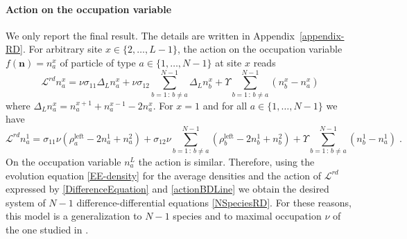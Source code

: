 \documentclass[10pt]{article}
\numberwithin{equation}{section}
\numberwithin{equation}{subsection}
\newcommand{\dt}{\;.}
\begin{document}
\paragraph{Action on the occupation variable}
We only report the final result. The details are written in Appendix~\ref{appendix-RD}. For arbitrary site $x\in \{2,\ldots,L-1\}$, the action on the occupation variable $f(\bm{n})=n_{a}^{x}$ of particle of type $a\in \{1,\ldots,N-1\}$ at site $x$ reads
\begin{equation}\label{DifferenceEquation}
	\mathcal{L}^{rd}n_{a}^{x}=\nu\sigma_{11}\Delta_{L}n_{a}^{x}+\nu\sigma_{12}\sum_{b=1\,:\,b\neq a}^{N-1}\Delta_{L}n_{b}^{x}+\Upsilon\sum_{b=1\,:\,b\neq a}^{N-1}(n_{b}^{x}-n_{a}^{x})
\end{equation}
where $\Delta_{L}n_{a}^{x}= n_{a}^{x+1}+n_{a}^{x-1}-2n_{a}^{x}$. For $x=1$ and for all $a\in \{1,\ldots,N-1\}$ we have 
\begin{equation}\label{actionBDLine}
	\mathcal{L}^{rd}n_{a}^{1}=\sigma_{11}\nu \left(\rho_{a}^{\text{left}}-2n_{a}^{1}+n_{a}^{2}\right)+\sigma_{12}\nu\sum_{b=1\,:\,b\neq a}^{N-1}\left(\rho_{b}^{\text{left}}-2n_{b}^{1}+n_{b}^{2}\right)+\Upsilon\sum_{b=1\,:\,b\neq a}^{N-1}\left(n_{b}^{1}-n_{a}^{1}\right)\dt
\end{equation}
On the occupation variable $n_{a}^{L}$ the action is similar. Therefore, using the evolution equation \eqref{EE-density} for the average densities and  the action of $\mathcal{L}^{rd}$ expressed by \eqref{DifferenceEquation} and \eqref{actionBDLine} we obtain the desired system of $N-1$ difference-differential equations \eqref{NSpeciesRD}. For these reasons, this model is a generalization to $N-1$ species and to maximal occupation $\nu$ of the one studied in \cite{casini2022uphill}. 
\end{document}
